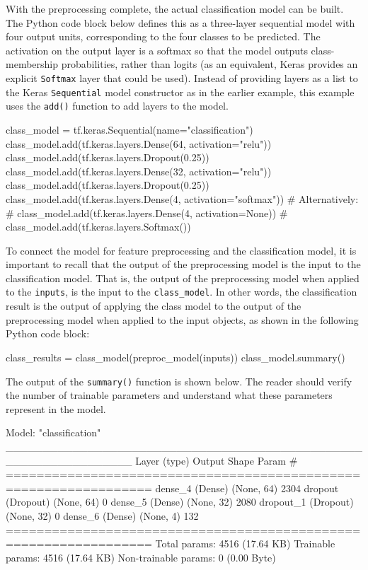 \begin{withcode}
With the preprocessing complete, the actual classification model can be built. The Python code block below defines this as a three-layer sequential model with four output units, corresponding to the four classes to be predicted. The activation on the output layer is a softmax so that the model outputs class-membership probabilities, rather than logits (as an equivalent, Keras provides an explicit \texttt{Softmax} layer that could be used). Instead of providing layers as a list to the Keras \texttt{Sequential} model constructor as in the earlier example, this example uses the \texttt{add()} function to add layers to the model.

\begin{pythoncode}
class_model = tf.keras.Sequential(name="classification")
class_model.add(tf.keras.layers.Dense(64, activation="relu"))
class_model.add(tf.keras.layers.Dropout(0.25))
class_model.add(tf.keras.layers.Dense(32, activation="relu"))
class_model.add(tf.keras.layers.Dropout(0.25))
class_model.add(tf.keras.layers.Dense(4, activation="softmax"))
# Alternatively:
# class_model.add(tf.keras.layers.Dense(4, activation=None))
# class_model.add(tf.keras.layers.Softmax())
\end{pythoncode}

To connect the model for feature preprocessing and the classification model, it is important to recall that the output of the preprocessing model is the input to the classification model. That is, the output of the preprocessing model when applied to the \texttt{inputs}, is the input to the \texttt{class\_model}. In other words, the classification result is the output of applying the class model to the output of the preprocessing model when applied to the input objects, as shown in the following Python code block:

\begin{pythoncode}
class_results = class_model(preproc_model(inputs))
class_model.summary()
\end{pythoncode}

The output of the \texttt{summary()} function is shown below. The reader should verify the number of trainable parameters and understand what these parameters represent in the model.

\begin{textcode}
Model: "classification"
_________________________________________________________________
 Layer (type)                Output Shape              Param #   
=================================================================
 dense_4 (Dense)             (None, 64)                2304      
 dropout (Dropout)           (None, 64)                0         
 dense_5 (Dense)             (None, 32)                2080      
 dropout_1 (Dropout)         (None, 32)                0         
 dense_6 (Dense)             (None, 4)                 132       
=================================================================
Total params: 4516 (17.64 KB)
Trainable params: 4516 (17.64 KB)
Non-trainable params: 0 (0.00 Byte)
\end{textcode}


\end{withcode}
